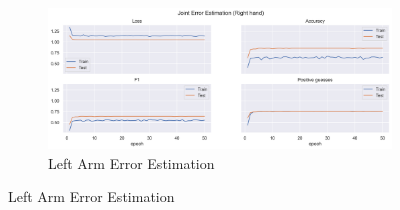 \begin{figure}[!ht]
\begin{subfigure}[b]{0.47\linewidth}
      \label{fig:v1_leha_jt_ee}
  \end{subfigure}
  \hfill
  \begin{subfigure}[b]{0.47\linewidth}
      \centering
      \includegraphics[width=\textwidth]{figures/Results/v1/jt/Right hand_ErrorEstimation.png}
      \caption{Left Arm Error Estimation}
      \label{fig:v1_riha_jt_ee}
  \end{subfigure}
\end{figure}

